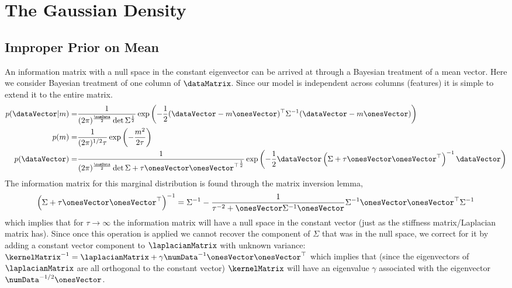 \chapter{The Gaussian Density}



\section{Improper Prior on Mean}
\label{sec:improperMean}

An information matrix with a null space in the constant eigenvector
can be arrived at through a Bayesian treatment of a mean vector. Here
we consider Bayesian treatment of one column of $\dataMatrix$. Since
our model is independent across columns (features) it is simple to
extend it to the entire matrix.
\begin{align*}
  p(\dataVector|m) = & \frac{1}{(2\pi)^{\frac{\numData}{2}}\det{\Sigma}^{\frac{1}{2}}} \exp \left(-\frac{1}{2}(\dataVector - m\onesVector)^\top \Sigma^{-1} (\dataVector - m\onesVector)\right)\\
  p(m) =& \frac{1}{(2\pi)^{1/2}\tau} \exp\left(-\frac{m^2}{2\tau}\right)\\
  p(\dataVector) = &\frac{1}{(2\pi)^{\frac{\numData}{2}}\det{\Sigma +
    \tau\onesVector\onesVector^\top}^{\frac{1}{2}}}\exp
  \left(-\frac{1}{2}\dataVector\left(\Sigma +
      \tau\onesVector\onesVector^\top\right)^{-1}\dataVector\right)
\end{align*}
The information matrix for this marginal distribution is found through
the matrix inversion lemma,
\begin{align*}
  \left(\Sigma + \tau\onesVector\onesVector^\top\right)^{-1} =
  \Sigma^{-1} -
  \frac{1}{\tau^{-2}+\onesVector\Sigma^{-1}\onesVector}\Sigma^{-1}\onesVector\onesVector^\top\Sigma^{-1}
\end{align*}
which implies that for $\tau\rightarrow \infty$ the information matrix
will have a null space in the constant vector (just as the stiffness
matrix/Laplacian matrix has). Since once this operation is applied we
cannot recover the component of $\Sigma$ that was in the null space,
we correct for it by adding a constant vector component to
$\laplacianMatrix$ with unknown variance: $\kernelMatrix^{-1}=
\laplacianMatrix +
\gamma\numData^{-1}\onesVector\onesVector^\top$ which implies
that (since the eigenvectors of $\laplacianMatrix$ are all orthogonal
to the constant vector) $\kernelMatrix$ will have an eigenvalue
$\gamma$ associated with the eigenvector $\numData^{-1/2}\onesVector$.


